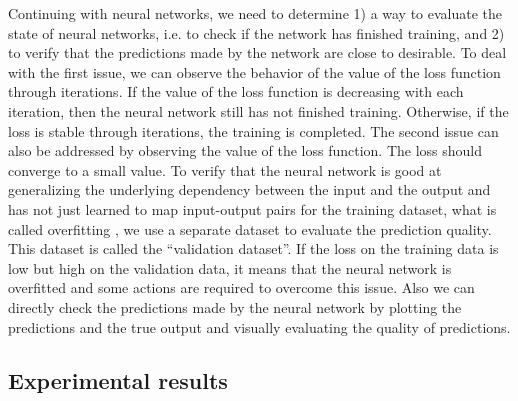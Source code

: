 Continuing with neural networks, we need to determine 1) a way to evaluate the state of neural networks, i.e. to check if the network has finished training, and 2) to verify that the predictions made by the network are close to desirable. To deal with the first issue, we can observe the behavior of the value of the loss function through iterations. If the value of the loss function is decreasing with each iteration, then the neural network still has not finished training. Otherwise, if the loss is stable through iterations, the training is completed. The second issue can also be addressed by observing the value of the loss function. The loss should converge to a small value. To verify that the neural network is good at generalizing the underlying dependency between the input and the output and has not just learned to map input-output pairs for the training dataset, what is called overfitting \cite{15}, we use a separate dataset to evaluate the prediction quality. This dataset is called the ``validation dataset''. If the loss on the training data is low but high on the validation data, it means that the neural network is overfitted and some actions are required to overcome this issue. Also we can directly check the predictions made by the neural network by plotting the predictions and the true output and visually evaluating the quality of predictions.

\subsection{Experimental results} \label{experiments_results}

